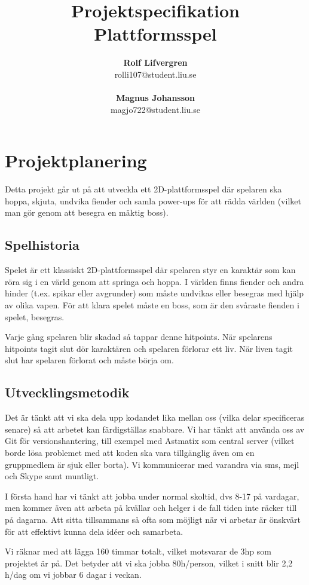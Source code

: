 \documentclass{article}
\author{\textbf{Rolf Lifvergren}\\
		rolli107@student.liu.se\\ \\
		\textbf{Magnus Johansson}\\
		magjo722@student.liu.se}
\title{Projektspecifikation \\
	Plattformsspel}
\begin{document}
\maketitle
\clearpage

\section{Projektplanering}
Detta projekt går ut på att utveckla ett 2D-plattformsspel där spelaren ska hoppa, skjuta, undvika fiender och samla power-ups för att rädda världen (vilket man gör genom att besegra en mäktig boss).

\subsection{Spelhistoria}
Spelet är ett klassiskt 2D-plattformsspel där spelaren styr en karaktär som kan röra sig i en värld genom att springa och hoppa. I världen finns fiender och andra hinder (t.ex. spikar eller avgrunder) som måste undvikas eller besegras med hjälp av olika vapen. För att klara spelet måste en boss, som är den svåraste fienden i spelet, besegras.

Varje gång spelaren blir skadad så tappar denne hitpoints. När spelarens hitpoints tagit slut dör karaktären och spelaren förlorar ett liv. När liven tagit slut har spelaren förlorat och måste börja om. 

\subsection{Utvecklingsmetodik}\label{utvecklingsmetodik}
Det är tänkt att vi ska dela upp kodandet lika mellan oss (vilka delar specificeras senare) så att arbetet kan färdigställas snabbare. Vi har tänkt att använda oss av Git för versionshantering, till exempel med Astmatix som central server (vilket borde lösa problemet med att koden ska vara tillgänglig även om en gruppmedlem är sjuk eller borta). Vi kommunicerar med varandra via sms, mejl och Skype samt muntligt.

I första hand har vi tänkt att jobba under normal skoltid, dvs 8-17 på vardagar, men kommer även att arbeta på kvällar och helger i de fall tiden inte räcker till på dagarna. Att sitta tillsammans så ofta som möjligt när vi arbetar är önskvärt för att effektivt kunna dela idéer och samarbeta.

Vi räknar med att lägga 160 timmar totalt, vilket motsvarar de 3hp som projektet är på. Det betyder att vi ska jobba 80h/person, vilket i snitt blir 2{,}2 h/dag om vi jobbar 6 dagar i veckan.
\end{document}
